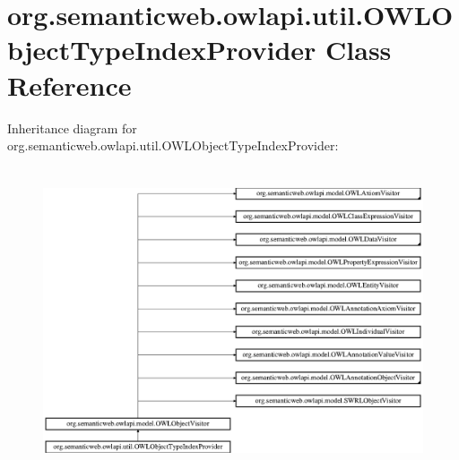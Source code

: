 \hypertarget{classorg_1_1semanticweb_1_1owlapi_1_1util_1_1_o_w_l_object_type_index_provider}{\section{org.\-semanticweb.\-owlapi.\-util.\-O\-W\-L\-Object\-Type\-Index\-Provider Class Reference}
\label{classorg_1_1semanticweb_1_1owlapi_1_1util_1_1_o_w_l_object_type_index_provider}
}
Inheritance diagram for org.\-semanticweb.\-owlapi.\-util.\-O\-W\-L\-Object\-Type\-Index\-Provider\-:\begin{figure}[H]
\begin{center}
\leavevmode
\includegraphics[height=9.056604cm]{classorg_1_1semanticweb_1_1owlapi_1_1util_1_1_o_w_l_object_type_index_provider}
\end{center}
\end{figure}
